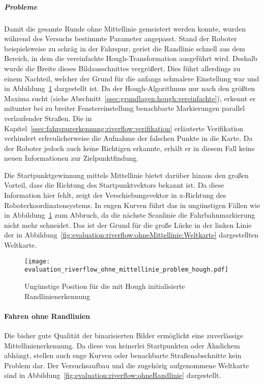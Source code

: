 \subparagraph{Probleme}
Damit die gesamte Runde ohne Mittellinie gemeistert werden konnte, wurden während des Versuchs bestimmte Parameter angepasst. Stand der Roboter beispielsweise zu schräg in der Fahrspur, geriet die Randlinie schnell aus dem Bereich, in dem die vereinfachte Hough-Transformation ausgeführt wird. Deshalb wurde die Breite dieses Bildausschnittes vergrößert.%
Dies führt allerdings zu einem Nachteil, welcher der Grund für die anfangs schmalere Einstellung war und in Abbildung~\ref{fig:evaluation:riverflow:ohneMittellinie:problem} dargestellt ist. Da der Hough-Algorithmus nur nach den größten Maxima sucht (siehe Abschnitt~\ref{ssec:grundlagen:hough:vereinfachte}), erkennt er mitunter bei zu breiter Fenstereinstellung benachbarte Markierungen parallel verlaufender Straßen. Die in Kapitel~\ref{ssec:fahrspurerkennung:riverflow:verifikation} erläuterte Verifikation verhindert erfreulicherweise die Aufnahme der falschen Punkte in die Karte. Da der Roboter jedoch auch keine Richtigen erkannte, erhält er in diesem Fall keine neuen Informationen zur Zielpunktfindung. 

Die Startpunktgewinnung mittels Mittellinie bietet darüber hinaus den großen Vorteil, dass die Richtung des Startpunktvektors bekannt ist. Da diese Information hier fehlt, zeigt der Verschiebungsvektor in x-Richtung des Roboterkoordinatensystems. In engen Kurven führt das in ungünstigen Fällen wie in Abbildung~\ref{fig:evaluation:riverflow:ohneMittellinie:problem} zum Abbruch, da die nächste Scanlinie die Fahrbahnmarkierung nicht mehr schneidet. Das ist der Grund für die große Lücke in der linken Linie der in Abbildung~\ref{fig:evaluation:riverflow:ohneMittellinie:Weltkarte} dargestellten Weltkarte. 

\begin{figure}[htbp] %
	\centering
	\texttt{[image: evaluation\_riverflow\_ohne\_mittellinie\_problem\_hough.pdf]}
	\caption{Ungünstige Position für die mit Hough initialisierte Randlinienerkennung}
	\label{fig:evaluation:riverflow:ohneMittellinie:problem}
\end{figure}

\paragraph{Fahren ohne Randlinien}
Die bisher gute Qualität der binarisierten Bilder ermöglicht eine zuverlässige Mittellinienerkennung. Da diese von keinerlei Startpunkten oder Ähnlichem abhängt, stellen auch enge Kurven oder benachbarte Straßenabschnitte kein Problem dar. Der Versuchsaufbau und die zugehörig aufgenommene Weltkarte sind in Abbildung~\ref{fig:evaluation:riverflow:ohneRandlinie} dargestellt.

